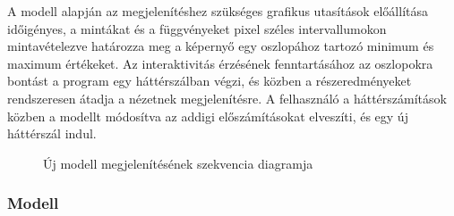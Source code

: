 A modell alapján az megjelenítéshez szükséges grafikus utasítások előállítása időigényes, a mintákat és a függvényeket pixel széles intervallumokon mintavételezve határozza meg a képernyő egy oszlopához tartozó minimum és maximum értékeket. Az interaktivitás érzésének fenntartásához az oszlopokra bontást a program egy háttérszálban végzi, és közben a részeredményeket rendszeresen átadja a nézetnek megjelenítésre. A felhasználó a háttérszámítások közben a modellt módosítva az addigi előszámításokat elveszíti, és egy új háttérszál indul.

\begin{figure}[h]
\centering
\caption{Új modell megjelenítésének szekvencia diagramja}
\end{figure}

\subsubsection{Modell}

